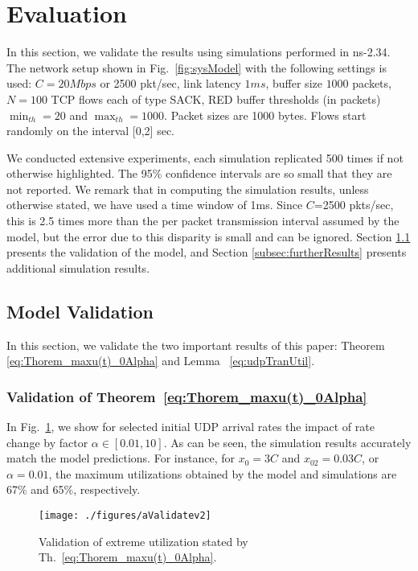 \documentclass{IEEEtran}
\begin{document}
    \section{Evaluation}\label{sec:evaluation}

In this section, we validate the results using simulations performed in ns-2.34. The network setup shown in Fig.~\ref{fig:sysModel} with the following settings is used: $C=20Mbps$ or 2500 pkt/sec, link latency $1ms$, buffer size $1000$ packets, $N=100$ TCP flows each of type SACK, RED buffer thresholds (in packets) $\min_{th}=20$ and $\max_{th}=1000$. Packet sizes are 1000 bytes. Flows start randomly on the interval [0,2] sec.

We conducted extensive experiments,  each simulation replicated 500 times if not otherwise highlighted. The 95\% confidence intervals are so small that they are not reported. We remark that in computing the simulation results, unless otherwise stated, we have used a time window of 1ms. Since $C$=2500 pkts/sec, this is 2.5 times more than the per packet transmission interval assumed by the model, but the error due to this disparity is small and can be ignored.
Section \ref{subsec:modelValidate} presents the validation of the model, and Section \ref{subsec:furtherResults} presents additional simulation results.

    \subsection{Model Validation}\label{subsec:modelValidate}
    In this section, we validate the two important results of this paper: Theorem \ref{eq:Thorem_maxu(t)_0Alpha} and Lemma ~\ref{eq:udpTranUtil}.

    \subsubsection{Validation of Theorem~\ref{eq:Thorem_maxu(t)_0Alpha}}
In Fig.~\ref{fig:uChokeTransient}, we show for selected initial UDP arrival rates the impact of rate change by factor $\alpha\in[0.01,10]$. As can be seen, the simulation results accurately match the model predictions. For instance, for $x_0=3C$ and $x_{02}=0.03C$, or $\alpha=0.01$, the maximum utilizations obtained by the model and simulations are 67\% and 65\%, respectively.


    \begin{figure}[thb!]
            \centering
            \texttt{[image: ./figures/aValidatev2]}\caption{Validation of extreme utilization stated by Th.~\ref{eq:Thorem_maxu(t)_0Alpha}.}
            \label{fig:uChokeTransient}
    \end{figure}
\end{document}
